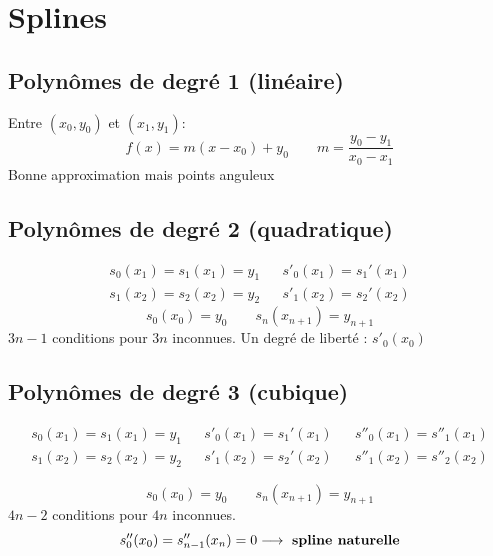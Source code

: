\documentclass[resume]{subfiles}
\begin{document}
    \section{Splines}
    \subsection{Polynômes de degré 1 (linéaire)}
        Entre $(x_0,y_0)$ et $(x_1,y_1)$:
        $$f(x)=m(x-x_0) + y_0\qquad m=\frac{y_0-y_1}{x_0-x_1}$$
        Bonne approximation mais points anguleux
    \subsection{Polynômes de degré 2 (quadratique)}
    \begin{align*}
        s_0(x_1) =s_1(x_1)= y_1 & &s'_0(x_1)=s_1'(x_1)\\
        s_1(x_2) =s_2(x_2)= y_2 & &s'_1(x_2)=s_2'(x_2)
    \end{align*}
    $$s_0(x_0)=y_0\qquad s_n(x_{n+1})=y_{n+1}$$
    $3n-1$ conditions pour $3n$ inconnues. Un degré de liberté : $s'_0(x_0)$
    
    \subsection{Polynômes de degré 3 (cubique)}
    \begin{small}
	    \begin{align*}
        s_0(x_1) =s_1(x_1)= y_1 & &s'_0(x_1)=s_1'(x_1) & & s''_0(x_1)=s''_1(x_1)\\
        s_1(x_2) =s_2(x_2)= y_2 & &s'_1(x_2)=s_2'(x_2) & & s''_1(x_2)=s''_2(x_2)
    \end{align*}    
    \end{small}
    $$s_0(x_0)=y_0\qquad s_n(x_{n+1})=y_{n+1}$$
    $4n-2$ conditions pour $4n$ inconnues.
    $$s''_0(x_0)=s''_{n-1}(x_n)=0\longrightarrow \text{ \textbf{spline naturelle}}$$
\end{document}
